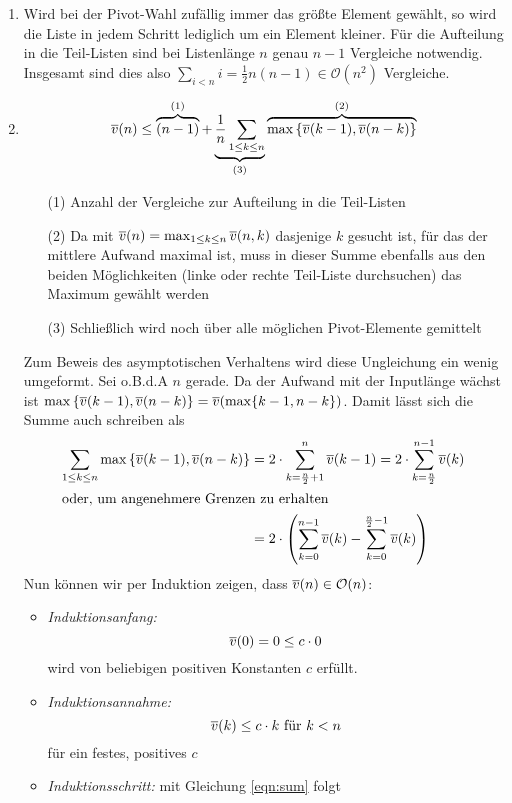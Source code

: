 \begin{enumerate}
\item
  Wird bei der Pivot-Wahl zufällig immer das größte Element gewählt, so wird
  die Liste in jedem Schritt lediglich um ein Element kleiner. Für die
  Aufteilung in die Teil-Listen sind bei Listenlänge $n$ genau $n-1$ Vergleiche
  notwendig. Insgesamt sind dies also $\sum_{i<n}i = \frac{1}{2}n(n-1) \in
  \mathcal{O}(n^2)$ Vergleiche.
\item
\[ \overline{v}(n) \leq \overbrace{(n-1)}^{(1)} +
\underbrace{\frac{1}{n}\sum_{1\leq k \leq n}}_{(3)}
\overbrace{\max\left\{\overline{v}(k-1),\overline{v}(n-k)\right\}}^{(2)} \]
\begin{itemize}
	\item[(1)] Anzahl der Vergleiche zur Aufteilung in die Teil-Listen
	\item[(2)] Da mit $\overline{v}(n) =
		\max_{1\leq k\leq n}\overline{v}(n,k)$ dasjenige $k$ gesucht ist, für das
		der mittlere Aufwand maximal ist, muss in dieser Summe
		ebenfalls aus den beiden Möglichkeiten (linke oder rechte
		Teil-Liste durchsuchen) das Maximum gewählt werden
	\item[(3)] Schließlich wird noch über alle möglichen Pivot-Elemente gemittelt
\end{itemize}
Zum Beweis des asymptotischen Verhaltens wird diese Ungleichung ein wenig
umgeformt. Sei o.B.d.A $n$ gerade. Da der Aufwand mit der Inputlänge wächst ist
$\max\left\{\overline{v}(k-1), \overline{v}(n-k)\right\} =
\overline{v}(\max\{k-1,n-k\})$. Damit lässt sich die Summe auch schreiben als
\begin{align} \nonumber \sum_{1\leq k\leq n} \max\left\{\overline{v}(k-1),\overline{v}(n-k)\right\}
&= 2 \cdot \sum_{k=\frac{n}{2}+1}^n \overline{v}(k-1) = 2 \cdot \sum_{k=\frac{n}{2}}^{n-1} \overline{v}(k) \\
\intertext{oder, um angenehmere Grenzen zu erhalten}
&= 2 \cdot \left(\sum_{k=0}^{n-1} \overline{v}(k) - \sum_{k=0}^{\frac{n}{2}-1} \overline{v}(k)\right) \label{eqn:sum}
\end{align}
Nun können wir per Induktion zeigen, dass $\overline{v}(n) \in \mathcal{O}(n)$:
\begin{itemize}
	\item \textit{Induktionsanfang:} \[ \overline{v}(0) = 0 \leq c \cdot 0 \]
		wird von beliebigen positiven Konstanten $c$ erfüllt.
	\item \textit{Induktionsannahme:} \[ \overline{v}(k) \leq c \cdot k \text{ für } k < n \]
		für ein festes, positives $c$
	\item \textit{Induktionsschritt:} mit Gleichung \eqref{eqn:sum} folgt

\end{itemize}
\end{enumerate}
